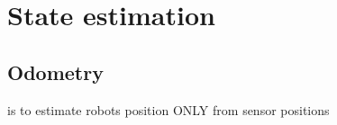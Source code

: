 \chapter{State estimation}

\section{Odometry}
    is to estimate robots position ONLY from sensor positions